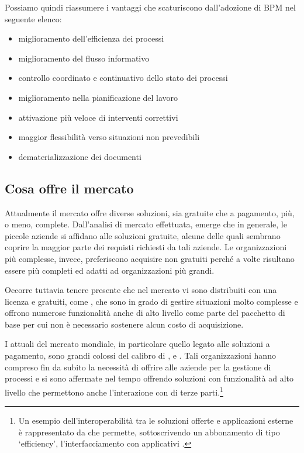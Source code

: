 Possiamo quindi riassumere i vantaggi che scaturiscono dall'adozione di \sw BPM nel seguente elenco:

\begin{itemize}
	\item miglioramento dell'efficienza dei processi
	\item miglioramento del flusso informativo
	\item controllo coordinato e continuativo dello stato dei processi
	\item miglioramento nella pianificazione del lavoro
	\item attivazione più veloce di interventi correttivi
	\item maggior flessibilità verso situazioni non prevedibili
	\item dematerializzazione dei documenti 	
\end{itemize}
	
\subsection{Cosa offre il mercato}\label{sec:currentmarket}
Attualmente il mercato offre diverse soluzioni, sia gratuite che a pagamento, più, o meno, complete.	
Dall'analisi di mercato effettuata, emerge che in generale, le piccole aziende si affidano alle soluzioni gratuite, alcune delle quali sembrano coprire la maggior parte dei requisti richiesti da tali aziende. Le organizzazioni più complesse, invece, preferiscono acquisire \sw non gratuiti perché a volte risultano essere più completi ed adatti ad organizzazioni più grandi.

Occorre tuttavia tenere presente che nel mercato vi sono \sw distribuiti con una licenza  e gratuiti, come , che sono in grado di gestire situazioni molto complesse e offrono numerose funzionalità anche di alto livello come parte del pacchetto di base per cui non è necessario sostenere alcun costo di acquisizione.
 
I  attuali del mercato mondiale, in particolare quello legato alle soluzioni \sw a pagamento, sono grandi colossi del calibro di ,  e . Tali organizzazioni hanno compreso fin da subito la necessità di offrire alle aziende \sw per la gestione di processi e si sono affermate nel tempo offrendo soluzioni con funzionalità ad alto livello che permettono anche l'interazione con \sw di terze parti.\footnote{%
Un esempio dell'interoperabilità tra le soluzioni offerte e applicazioni esterne è rappresentato da  che permette, sottoscrivendo un abbonamento di tipo `\textsf{efficiency}', l'interfacciamento con applicativi .
}

